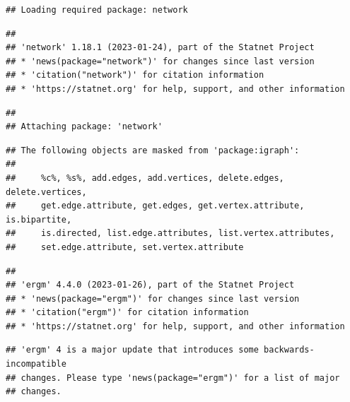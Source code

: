 \documentclass[
]{book}
\begin{document}
\begin{verbatim}
## Loading required package: network
\end{verbatim}

\begin{verbatim}
## 
## 'network' 1.18.1 (2023-01-24), part of the Statnet Project
## * 'news(package="network")' for changes since last version
## * 'citation("network")' for citation information
## * 'https://statnet.org' for help, support, and other information
\end{verbatim}

\begin{verbatim}
## 
## Attaching package: 'network'
\end{verbatim}

\begin{verbatim}
## The following objects are masked from 'package:igraph':
## 
##     %c%, %s%, add.edges, add.vertices, delete.edges, delete.vertices,
##     get.edge.attribute, get.edges, get.vertex.attribute, is.bipartite,
##     is.directed, list.edge.attributes, list.vertex.attributes,
##     set.edge.attribute, set.vertex.attribute
\end{verbatim}

\begin{verbatim}
## 
## 'ergm' 4.4.0 (2023-01-26), part of the Statnet Project
## * 'news(package="ergm")' for changes since last version
## * 'citation("ergm")' for citation information
## * 'https://statnet.org' for help, support, and other information
\end{verbatim}

\begin{verbatim}
## 'ergm' 4 is a major update that introduces some backwards-incompatible
## changes. Please type 'news(package="ergm")' for a list of major
## changes.
\end{verbatim}
\end{document}
